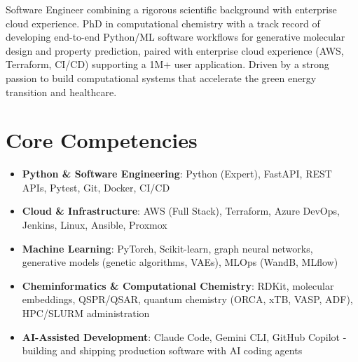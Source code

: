 \documentclass[11pt,a4paper,sans]{moderncv}
\begin{document}
\makecvtitle


\vspace{6pt}
\small{Software Engineer combining a rigorous scientific background with enterprise cloud experience. PhD in computational chemistry with a track record of developing end-to-end Python/ML software workflows for generative molecular design and property prediction, paired with enterprise cloud experience (AWS, Terraform, CI/CD) supporting a 1M+ user application. Driven by a strong passion to build computational systems that accelerate the green energy transition and healthcare.}


\section{Core Competencies}
\vspace{1pt}
\begin{itemize}

\item \textbf{Python \& Software Engineering}: Python (Expert), FastAPI, REST APIs, Pytest, Git, Docker, CI/CD

\item \textbf{Cloud \& Infrastructure}: AWS (Full Stack), Terraform, Azure DevOps, Jenkins, Linux, Ansible, Proxmox

\item \textbf{Machine Learning}: PyTorch, Scikit-learn, graph neural networks, generative models (genetic algorithms, VAEs), MLOps (WandB, MLflow)

\item \textbf{Cheminformatics \& Computational Chemistry}: RDKit, molecular embeddings, QSPR/QSAR, quantum chemistry (ORCA, xTB, VASP, ADF), HPC/SLURM administration

\item \textbf{AI-Assisted Development}: Claude Code, Gemini CLI, GitHub Copilot - building and shipping production software with AI coding agents

\end{itemize}

\end{document}
